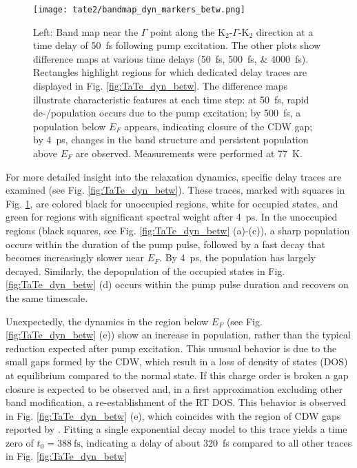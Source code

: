 \begin{figure}[t!]
	\centering
	\texttt{[image: tate2/bandmap\_dyn\_markers\_betw.png]}
	\caption{Left: Band map near the $\Gamma$ point along the K$_2$-$\Gamma$-K$_2$ direction at a time delay of \qty{50}{\femto\second} following pump excitation. The other plots show difference maps at various time delays (\qtylist{50;500;4000}{\femto\second}). Rectangles highlight regions for which dedicated delay traces are displayed in Fig. \ref{fig:TaTe_dyn_betw}. The difference maps illustrate characteristic features at each time step: at \qty{50}{\femto\second}, rapid de-/population occurs due to the pump excitation; by \qty{500}{\femto\second}, a population below $E_F$ appears, indicating closure of the CDW gap; by \qty{4}{\pico\second}, changes in the band structure and persistent population above $E_F$ are observed. Measurements were performed at \qty{77}{\kelvin}.}
	\label{fig:TaTe_bandmap_dyn_betw}
\end{figure}

For more detailed insight into the relaxation dynamics, specific delay traces are examined (see Fig. \ref{fig:TaTe_dyn_betw}).
These traces, marked with squares in Fig. \ref{fig:TaTe_bandmap_dyn_betw}, are colored black for unoccupied regions, white for occupied states, and green for regions with significant spectral weight after \qty{4}{\pico\second}.
In the unoccupied regions (black squares, see Fig. \ref{fig:TaTe_dyn_betw} (a)-(c)), a sharp population occurs within the duration of the pump pulse, followed by a fast decay that becomes increasingly slower near $E_F$.
By \qty{4}{\pico\second}, the population has largely decayed.
Similarly, the depopulation of the occupied states in Fig. \ref{fig:TaTe_dyn_betw} (d) occurs within the pump pulse duration and recovers on the same timescale.

Unexpectedly, the dynamics in the region below $E_F$ (see Fig. \ref{fig:TaTe_dyn_betw} (e)) show an increase in population, rather than the typical reduction expected after pump excitation.
This unusual behavior is due to the small gaps formed by the CDW, which result in a loss of density of states (DOS) at equilibrium compared to the normal state.
If this charge order is broken a gap closure is expected to be observed and, in a first approximation excluding other band modification, a re-establishment of the RT DOS.
This behavior is observed in Fig. \ref{fig:TaTe_dyn_betw} (e), which coincides with the region of CDW gaps reported by \cite{lin_evidence_2022}.
Fitting a single exponential decay model to this trace yields a time zero of $t_0=\qty{388}{\femto\second}$, indicating a delay of about \qty{320}{\femto\second} compared to all other traces in Fig. \ref{fig:TaTe_dyn_betw}

